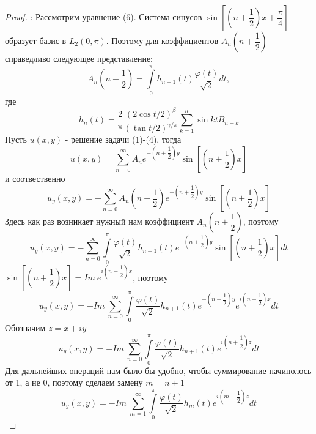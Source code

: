 \documentclass[12pt, a4paper]{extarticle}
\numberwithin{equation}{section}
\numberwithin{lemma}{section}
\numberwithin{definition}{section}
\numberwithin{notabene}{section}
\numberwithin{corollary}{section}
\begin{document}
	\begin{proof}:
		\newline
		Рассмотрим уравнение (6). Система синусов $\sin{\left[\left(n +\dfrac12\right)x + \dfrac\pi4\right]}$ образует базис в $L_2(0,\pi)$. Поэтому для коэффициентов $A_n\left(n+\dfrac12\right)$ справедливо следующее представление:
		\begin{equation*}
			A_n\left(n+\dfrac12\right) = \int\limits_0^\pi h_{n+1}(t) \dfrac{\varphi(t)}{\sqrt2} dt, 
	\end{equation*}
	где
	\begin{equation*}
		h_n(t) = \dfrac{2}{\pi}\dfrac{(2\cos{t/2})^\beta}{(\tan{t/2})^{\gamma/\pi}} \sum\limits_{k=1}^n \sin{kt} B_{n-k}
	\end{equation*}
	Пусть $u(x,y)$ - решение задачи (1)-(4), тогда
	\begin{equation*}
		u(x,y) = \sum\limits_{n=0}^{\infty} A_n e^{-\left(n + \dfrac12\right)y} \sin{\left[\left(n + \dfrac12\right)x\right]}
	\end{equation*}
	и соотвественно
	\begin{equation*}
		u_y(x,y) = -\sum\limits_{n=0}^{\infty} A_n \left(n +\dfrac12\right) e^{-\left(n + \dfrac12\right)y} \sin{\left[\left(n + \dfrac12\right)x\right]}
	\end{equation*}
	Здесь как раз возникает нужный нам коэффициент $A_n \left(n+\dfrac12\right)$, поэтому
	\begin{equation*}
		u_y(x,y)  = - \sum\limits_{n=0}^{\infty}  \int\limits_0^\pi \dfrac{\varphi(t)}{\sqrt2}  h_{n+1}(t)  e^{-\left(n + \dfrac12\right)y} \sin{\left[\left(n + \dfrac12\right)x\right]} dt
	\end{equation*}
	$\sin{\left[\left(n + \dfrac12\right)x\right]} = Im \ e^{i\left(n + \dfrac12\right)x}$, поэтому
	\begin{equation*}
		u_y(x,y)  = -  Im \ \sum\limits_{n=0}^{\infty}  \int\limits_0^\pi \dfrac{\varphi(t)}{\sqrt2}  h_{n+1}(t)  e^{-\left(n + \dfrac12\right)y} e^{i\left(n + \dfrac12\right)x} dt
	\end{equation*}
	Обозначим $z = x + iy$
\begin{equation*}
	u_y(x,y)  = -  Im \ \sum\limits_{n=0}^{\infty}  \int\limits_0^\pi \dfrac{\varphi(t)}{\sqrt2}  h_{n+1}(t)  e^{i\left(n+\dfrac12\right) z}  dt
\end{equation*}
	Для дальнейших операций нам было бы удобно, чтобы суммирование начинолось от 1, а не 0, поэтому сделаем замену $m = n +1$
	\begin{equation*}
		u_y(x,y)  = -  Im \ \sum\limits_{m=1}^{\infty}  \int\limits_0^\pi \dfrac{\varphi(t)}{\sqrt2}  h_{m}(t)  e^{i\left(m-\dfrac12\right) z}  dt

\end{equation*}
\end{proof}
\end{document}
